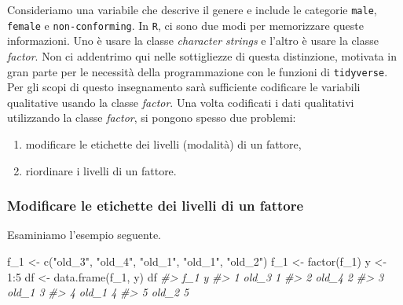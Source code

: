 \documentclass[
]{memoir}
\newenvironment{Shaded}{\begin{snugshade}}{\end{snugshade}}
\newcommand{\CommentTok}[1]{\textcolor[rgb]{0.56,0.35,0.01}{\textit{#1}}}
\newcommand{\DecValTok}[1]{\textcolor[rgb]{0.00,0.00,0.81}{#1}}
\newcommand{\FunctionTok}[1]{\textcolor[rgb]{0.00,0.00,0.00}{#1}}
\newcommand{\NormalTok}[1]{#1}
\newcommand{\OtherTok}[1]{\textcolor[rgb]{0.56,0.35,0.01}{#1}}
\newcommand{\SpecialCharTok}[1]{\textcolor[rgb]{0.00,0.00,0.00}{#1}}
\newcommand{\StringTok}[1]{\textcolor[rgb]{0.31,0.60,0.02}{#1}}
\providecommand{\tightlist}{%
  \setlength{\itemsep}{0pt}\setlength{\parskip}{0pt}}
\theoremstyle{definition}
\theoremstyle{definition}
\theoremstyle{definition}
\theoremstyle{definition}
\theoremstyle{remark}
\begin{document}
Consideriamo una variabile che descrive il genere e include le categorie \texttt{male}, \texttt{female} e \texttt{non-conforming}. In \texttt{R}, ci sono due modi per memorizzare queste informazioni. Uno è usare la classe \emph{character strings} e l'altro è usare la classe \emph{factor}. Non ci addentrimo qui nelle sottigliezze di questa distinzione, motivata in gran parte per le necessità della programmazione con le funzioni di \texttt{tidyverse}. Per gli scopi di questo insegnamento sarà sufficiente codificare le variabili qualitative usando la classe \emph{factor}. Una volta codificati i dati qualitativi utilizzando la classe \emph{factor}, si pongono spesso due problemi:

\begin{enumerate}
\def\labelenumi{\arabic{enumi}.}
\tightlist
\item
  modificare le etichette dei livelli (modalità) di un fattore,
\item
  riordinare i livelli di un fattore.
\end{enumerate}

\hypertarget{modificare-le-etichette-dei-livelli-di-un-fattore}{%
\subsubsection{Modificare le etichette dei livelli di un fattore}\label{modificare-le-etichette-dei-livelli-di-un-fattore}}

Esaminiamo l'esempio seguente.

\begin{Shaded}
\begin{Highlighting}[]
\NormalTok{f\_1 }\OtherTok{\textless{}{-}} \FunctionTok{c}\NormalTok{(}\StringTok{"old\_3"}\NormalTok{, }\StringTok{"old\_4"}\NormalTok{, }\StringTok{"old\_1"}\NormalTok{, }\StringTok{"old\_1"}\NormalTok{, }\StringTok{"old\_2"}\NormalTok{)}
\NormalTok{f\_1 }\OtherTok{\textless{}{-}} \FunctionTok{factor}\NormalTok{(f\_1)}
\NormalTok{y }\OtherTok{\textless{}{-}} \DecValTok{1}\SpecialCharTok{:}\DecValTok{5}
\NormalTok{df }\OtherTok{\textless{}{-}} \FunctionTok{data.frame}\NormalTok{(f\_1, y)}
\NormalTok{df}
\CommentTok{\#\textgreater{}     f\_1 y}
\CommentTok{\#\textgreater{} 1 old\_3 1}
\CommentTok{\#\textgreater{} 2 old\_4 2}
\CommentTok{\#\textgreater{} 3 old\_1 3}
\CommentTok{\#\textgreater{} 4 old\_1 4}
\CommentTok{\#\textgreater{} 5 old\_2 5}
\end{Highlighting}
\end{Shaded}
\end{document}
